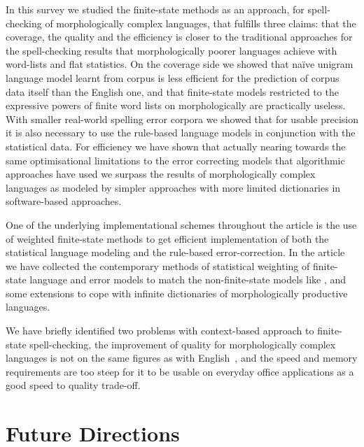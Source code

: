 \documentclass[a4paper,12pt]{article}
\begin{document}
In this survey we studied the finite-state methods as an approach, for
spell-checking of morphologically complex languages, that fulfills three
claims: that the coverage, the quality and the efficiency is closer to the
traditional approaches for the spell-checking results that morphologically
poorer languages achieve with word-lists and flat statistics. On the coverage
side we showed that naïve unigram language model learnt from corpus is
less efficient for the prediction of corpus data itself than the English one,
and that finite-state models restricted to the expressive powers of finite
word lists on morphologically are practically useless. With smaller real-world
spelling error corpora we showed that for usable precision it is also necessary
to use the rule-based language models in conjunction with the statistical
data. For efficiency we have shown that actually nearing towards the same
optimisational limitations to the error correcting models that algorithmic
approaches have used we surpass the results of morphologically complex 
languages as modeled by simpler approaches with more limited dictionaries in
software-based approaches.

One of the underlying implementational schemes throughout the article is the
use of weighted finite-state methods to get efficient implementation of both
the statistical language modeling and the rule-based error-correction. In the
article we have collected the contemporary methods of statistical weighting
of finite-state language and error models to match the non-finite-state models
like \cite{church1990,}, and some extensions to cope with infinite dictionaries
of morphologically productive languages.

We have briefly identified two problems with context-based approach to
finite-state spell-checking, the improvement of quality for morphologically
complex languages is not on the same figures as with
English~\cite{wilcoxohearn}, and the speed and memory requirements are too
steep for it to be usable on everyday office applications as a good speed to
quality trade-off.

\section{Future Directions}
\label{sec:future}
\end{document}
